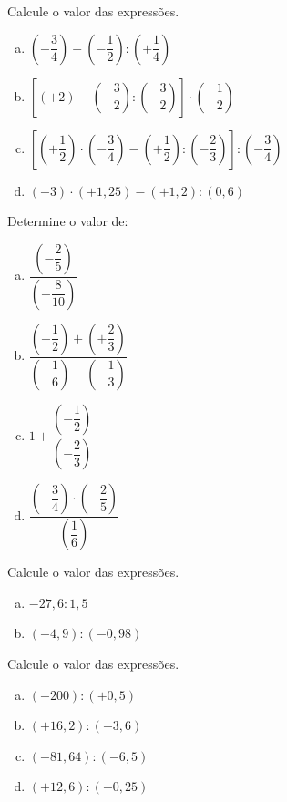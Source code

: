 \item Calcule o valor das expressões.
\begin{enumerate}[a)]
	\item $\left(-\dfrac{3}{4}\right) + \left(-\dfrac{1}{2}\right):\left(+\dfrac{1}{4}\right)$
	\item $\left[(+2) - \left(-\dfrac{3}{2}\right):\left(-\dfrac{3}{2}\right)\right]\cdot\left(-\dfrac{1}{2}\right)$
	\item $\left[\left(+\dfrac{1}{2}\right)\cdot \left(-\dfrac{3}{4}\right) - \left(+\dfrac{1}{2}\right) : \left(-\dfrac{2}{3}\right)\right]: \left(-\dfrac{3}{4}\right)$
	\item $(-3)\cdot (+1,25) - (+1,2) : (0,6)$
\end{enumerate}

\item Determine o valor de:
\begin{multicols}{2}
\begin{enumerate}[a)]
	\item $\dfrac{\left(-\dfrac{2}{5}\right)}{\left(-\dfrac{8}{10}\right)}$
	\item $\dfrac{\left(-\dfrac{1}{2}\right) + \left(+\dfrac{2}{3}\right)}{\left( -\dfrac{1}{6} \right) - \left(-\dfrac{1}{3} \right)}$
	\item $1 + \dfrac{\left(-\dfrac{1}{2}\right)}{\left(-\dfrac{2}{3}\right)}$
	\item $\dfrac{\left(-\dfrac{3}{4}\right)\cdot \left(-\dfrac{2}{5}\right)}{\left(\dfrac{1}{6} \right)}$
\end{enumerate}
\end{multicols}

\item Calcule o valor das expressões.
\begin{multicols}{2}
\begin{enumerate}[a)]
	\item $-27,6:1,5$
	\item $(-4,9):(-0,98)$
\end{enumerate}
\end{multicols}

\item Calcule o valor das expressões.
\begin{multicols}{2}
\begin{enumerate}[a)]
	\item $(-200):(+0,5)$
	\item $(+16,2):(-3,6)$
	\item $(-81,64):(-6,5)$
	\item $(+12,6):(-0,25)$
\end{enumerate}
\end{multicols}

